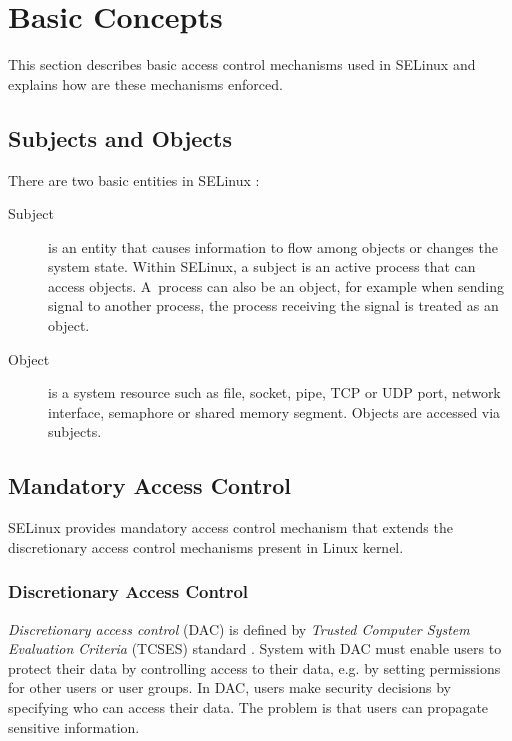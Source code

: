 \section{Basic Concepts}

This section describes basic access control mechanisms used in SELinux and
explains how are these mechanisms enforced.

\subsection{Subjects and Objects}

There are two basic entities in SELinux \cite[p.~29]{tsn}:
\begin{description}
    \item [Subject] is an entity that causes information to flow among objects
        or changes the system state. Within SELinux, a subject is an active
        process that can access objects. A~process can also be an object, for
        example when sending signal to another process, the process receiving
        the signal is treated as an object.
    \item [Object] is a system resource such as file, socket, pipe, TCP or UDP
        port, network interface, semaphore or shared memory segment. Objects
        are accessed via subjects.
\end{description}

\subsection{Mandatory Access Control}

SELinux provides mandatory access control mechanism that extends the
discretionary access control mechanisms present in Linux kernel.

\subsubsection{Discretionary Access Control}
\emph{Discretionary access control} (DAC) is defined by \emph{Trusted Computer
System Evaluation Criteria} (TCSES) standard \cite{orangebook}. System with DAC
must enable users to protect their data by controlling access to their data,
e.g. by setting permissions for other users or user groups. In DAC, users make
security decisions by specifying who can access their data. The problem is that
users can propagate sensitive information.

